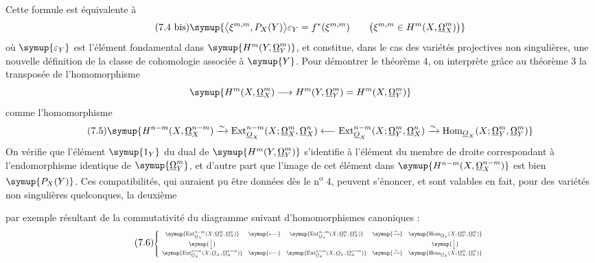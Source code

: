 Cette formule est équivalente à
\begin{equation}\tag{7.4 bis}
  \symup{\bigl\langle\xi^{m,m},P_X(Y)\bigr\rangle\varepsilon_Y
  =f^{*}(\xi^{m,m})
  \qquad
  \bigl(\xi^{m,m}\in H^{m}(X,\underline{\Omega}_X^{m})\bigr)}
\end{equation}
 où
$\symup{\varepsilon_Y}$ est l'élément fondamental dans $\symup{H^{m}(Y,\underline{\Omega}_Y^{m})}$, et
constitue, dans le cas des variétés projectives non singulières, une nouvelle
définition de la classe de cohomologie associée à $\symup{Y}$. Pour démontrer le
théorème 4, on interprète grâce au théorème 3 la transposée de l'homomorphisme
\[
  \symup{H^{m}(X,\underline{\Omega}_X^{m})
  \longrightarrow H^{m}(Y,\underline{\Omega}_Y^{m})
  =H^{m}(X,\underline{\Omega}_Y^{m})}
\]
comme l'homomorphisme
\begin{equation}\tag{7.5}
\symup{H^{n-m}(X,\underline{\Omega}_X^{n-m})
  \xrightarrow{\sim}
  \operatorname{Ext}_{\Osh_X}^{n-m}(X;\underline{\Omega}_X^{m},\underline{\Omega}_X^{n})
  \longleftarrow
  \operatorname{Ext}_{\Osh_X}^{n-m}(X;\underline{\Omega}_Y^{m},\underline{\Omega}_X^{n})
  \xrightarrow{\sim}
  \operatorname{Hom}_{\Osh_X}(X;\underline{\Omega}_Y^{m},\underline{\Omega}_Y^{m})}
\end{equation}
On vérifie que l'élément $\symup{1_Y}$ du dual de $\symup{H^{m}(Y,\underline{\Omega}_Y^{m})}$ s'identifie
à l'élément du membre de droite correspondant à l'endomorphisme identique de
$\symup{\underline{\Omega}_Y^{m}}$, et d'autre part que l'image de cet élément dans
$\symup{H^{n-m}(X,\underline{\Omega}_X^{n-m})}$ est bien $\symup{P_X(Y)}$. Ces compatibilités, qui auraient
pu être données dès le n\textsuperscript{o} 4, peuvent s'énoncer, et sont
valables en fait, pour des variétés non singulières quelconques, la deuxième

par exemple résultant de la commutativité du diagramme suivant d'homomorphismes
canoniques :
\begin{equation}\tag{7.6}
\resizebox{\textwidth}{!}{$
\left\{
\begin{array}{ccccc}
\symup{\operatorname{Ext}_{\Osh_X}^{n-m}(X;\underline{\Omega}_X^{m},\underline{\Omega}_X^{n})}
&
\symup{\longleftarrow}
&
\symup{\operatorname{Ext}_{\Osh_X}^{n-m}(X;\underline{\Omega}_Y^{m},\underline{\Omega}_X^{n})}
&
\symup{\xrightarrow{\sim}}
&
\symup{\operatorname{Hom}_{\Osh_X}(X;\underline{\Omega}_Y^{m},\underline{\Omega}_Y^{m})}
\\[3pt]
\symup{\Big\downarrow}
&&&&
\symup{\Big\downarrow}
\\[3pt]
\symup{\operatorname{Ext}_{\Osh_X}^{n-m}(X;\Osh_X,\underline{\Omega}_X^{n-m})}
&
\symup{\longleftarrow}
&
\symup{\operatorname{Ext}_{\Osh_X}^{n-m}(X;\Osh_Y,\underline{\Omega}_X^{n-m})}
&
\symup{\xrightarrow{\sim}}
&
\symup{\operatorname{Hom}_{\Osh_X}(X;\underline{\Omega}_X^{m},\underline{\Omega}_Y^{m})}
\end{array}
\right.
$}
\end{equation}

